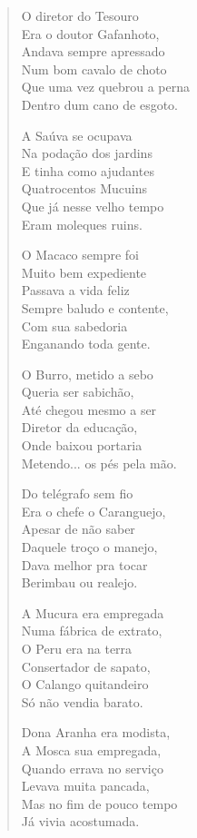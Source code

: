 \begin{verse}
O diretor do Tesouro\\
Era o doutor Gafanhoto,\\
Andava sempre apressado\\
Num bom cavalo de choto\\
Que uma vez quebrou a perna\\
Dentro dum cano de esgoto.

A Saúva se ocupava\\
Na podação dos jardins\\
E tinha como ajudantes\\
Quatrocentos Mucuins\\
Que já nesse velho tempo\\
Eram moleques ruins.


O Macaco sempre foi\\
Muito bem expediente\\
Passava a vida feliz\\
Sempre baludo e contente,\\
Com sua sabedoria\\
Enganando toda gente.

O Burro, metido a sebo\\
Queria ser sabichão,\\
Até chegou mesmo a ser\\
Diretor da educação,\\
Onde baixou portaria\\
Metendo... os pés pela mão.

Do telégrafo sem fio\\
Era o chefe o Caranguejo,\\
Apesar de não saber\\
Daquele troço o manejo,\\
Dava melhor pra tocar\\
Berimbau ou realejo.

A Mucura era empregada\\
Numa fábrica de extrato,\\
O Peru era na terra\\
Consertador de sapato,\\
O Calango quitandeiro\\
Só não vendia barato.


Dona Aranha era modista,\\
A Mosca sua empregada,\\
Quando errava no serviço\\
Levava muita pancada,\\
Mas no fim de pouco tempo\\
Já vivia acostumada.


\end{verse}
